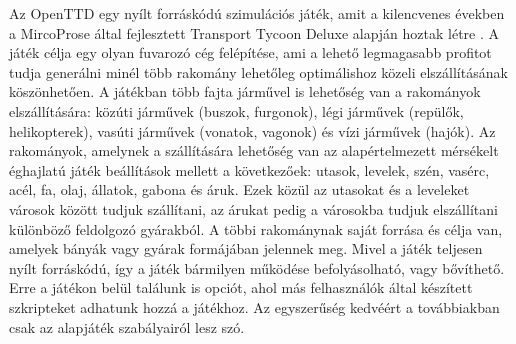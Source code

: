 

Az OpenTTD egy nyílt forráskódú szimulációs játék, amit a kilencvenes években a MircoProse által fejlesztett Transport Tycoon Deluxe alapján hoztak létre \cite{openttd}. A játék célja egy olyan fuvarozó cég felépítése, ami a lehető legmagasabb profitot tudja generálni minél több rakomány lehetőleg optimálishoz közeli elszállításának köszönhetően. A játékban több fajta járművel is lehetőség van a rakományok elszállítására: közúti járművek (buszok, furgonok), légi járművek (repülők, helikopterek), vasúti járművek (vonatok, vagonok) és vízi járművek (hajók). Az rakományok, amelynek a szállítására lehetőség van az alapértelmezett mérsékelt éghajlatú játék beállítások mellett a következőek: utasok, levelek, szén, vasérc, acél, fa, olaj, állatok, gabona és áruk. Ezek közül az utasokat és a leveleket városok között tudjuk szállítani, az árukat pedig a városokba tudjuk elszállítani különböző feldolgozó gyárakból. A többi rakománynak saját forrása és célja van, amelyek bányák vagy gyárak formájában jelennek meg. Mivel a játék teljesen nyílt forráskódú, így a játék bármilyen működése befolyásolható, vagy bővíthető. Erre a játékon belül találunk is opciót, ahol más felhasználók által készített szkripteket adhatunk hozzá a játékhoz. Az egyszerűség kedvéért a továbbiakban csak az alapjáték szabályairól lesz szó.

